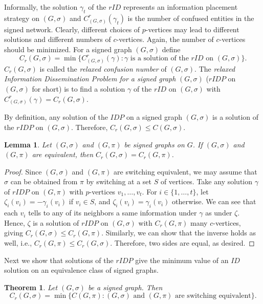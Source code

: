 \documentclass[a4paper,11pt]{article}
\newtheorem{theo}[defi]{Theorem}
\newtheorem{lem}[defi]{Lemma}
\theoremstyle{remark}
\begin{document}
Informally, the solution $\gamma_t$ of the $rID$ represents an information placement strategy on $(G,\sigma)$ and 
$C_{(G,\sigma)}^r(\gamma_t)$ is the number of confused entities in the signed network. 
Clearly, different choices of $p$-vertices may lead to different solutions and different numbers of $c$-vertices. 
Again, the number of $c$-vertices should be minimized. For a signed graph $(G,\sigma)$ define 
$$C_r(G,\sigma) = \min \{C_{(G,\sigma)}^r(\gamma) \colon \gamma \text{ is a solution of the } rID \text{ on } (G,\sigma)\}.$$
$C_r(G,\sigma)$ is called the {\em relaxed confusion number} of $(G,\sigma)$.
The {\em relaxed Information Dissemination Problem for a signed graph} $(G,\sigma)$ ($rIDP$ on $(G,\sigma)$ for short) is to find a solution $\gamma$ of the $rID$ on $(G,\sigma)$
with $C_{(G,\sigma)}^r(\gamma) = C_r(G,\sigma)$. 

By definition, any solution of the $IDP$ on a signed graph $(G,\sigma)$ is a solution of the $rIDP$ on $(G,\sigma)$. Therefore, 
$C_r(G,\sigma)\leq C(G,\sigma)$.

\begin{lem} \label{Prop: same C_r} 
Let $(G,\sigma)$ and $(G,\pi)$ be signed graphs on $G$.
    If $(G,\sigma)$ and $(G,\pi)$ are equivalent, then $C_r(G,\sigma) = C_r(G,\pi)$.
\end{lem}


\begin{proof}
    Since $(G,\sigma)$ and $(G,\pi)$ are switching equivalent, we may assume that $\sigma$ can be obtained from $\pi$ by switching at a set $S$ of vertices.
    Take any solution $\gamma$ of $rIDP$ on $(G,\pi)$ with $p$-vertices $v_1,\ldots, v_t$. For $i\in\{1,\ldots, t\}$, let $\zeta_i(v_i)=-\gamma_i(v_i)$ if $v_i\in S$, and $\zeta_i(v_i)=\gamma_i(v_i)$ otherwise.
    We can see that each $v_i$ tells to any of its neighbors a same information under $\gamma$ as under $\zeta$.
    Hence, $\zeta$ is a solution of $rIDP$ on $(G,\sigma)$ with $C_r(G,\pi)$ many $c$-vertices, giving $C_r(G,\sigma)\leq C_r(G,\pi)$.
    Similarly, we can show that the inverse holds as well, i.e., $C_r(G,\pi) \leq C_r(G,\sigma)$.
    Therefore, two sides are equal, as desired.
\end{proof}

Next we show that solutions of the  $rIDP$ give the minimum value of an $ID$ solution on an equivalence class of signed graphs. 

\begin{theo} \label{Theo: relaxed confusion number}
    Let $(G,\sigma)$ be a signed graph. Then $$C_r(G,\sigma) = 
    \min \{C(G,\pi) \colon (G,\sigma) \text{ and } (G,\pi) \text{ are switching equivalent} \}.$$
\end{theo}
\end{document}

